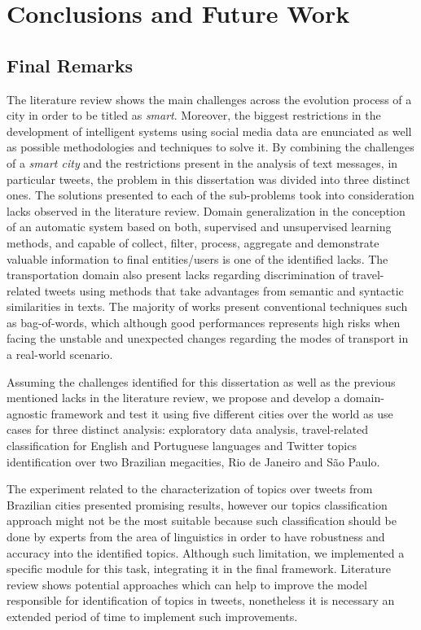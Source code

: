 \chapter{Conclusions and Future Work} \label{chap:conclusions}

\minitoc \mtcskip \noindent

\section{Final Remarks}
The literature review shows the main challenges across the evolution process of a city in order to be titled as \textit{smart}. Moreover, the biggest restrictions in the development of intelligent systems using social media data are enunciated as well as possible methodologies and techniques to solve it. By combining the challenges of a \textit{smart city} and the restrictions present in the analysis of text messages, in particular tweets, the problem in this dissertation was divided into three distinct ones. The solutions presented to each of the sub-problems took into consideration lacks observed in the literature review. Domain generalization in the conception of an automatic system based on both, supervised and unsupervised learning methods, and capable of collect, filter, process, aggregate and demonstrate valuable information to final entities/users is one of the identified lacks. The transportation domain also present lacks regarding discrimination of travel-related tweets using methods that take advantages from semantic and syntactic similarities in texts. The majority of works present conventional techniques such as bag-of-words, which although good performances represents high risks when facing the unstable and unexpected changes regarding the modes of transport in a real-world scenario.

Assuming the challenges identified for this dissertation as well as the previous mentioned lacks in the literature review, we propose and develop a domain-agnostic framework and test it using five different cities over the world as use cases for three distinct analysis: exploratory data analysis, travel-related classification for English and Portuguese languages and Twitter topics identification over two Brazilian megacities, Rio de Janeiro and São Paulo.

The experiment related to the characterization of topics over tweets from Brazilian cities presented promising results, however our topics classification approach might not be the most suitable because such classification should be done by experts from the area of linguistics in order to have robustness and accuracy into the identified topics. Although such limitation, we implemented a specific module for this task, integrating it in the final framework. Literature review shows potential approaches which can help to improve the model responsible for identification of topics in tweets, nonetheless it is necessary an extended period of time to implement such improvements.

